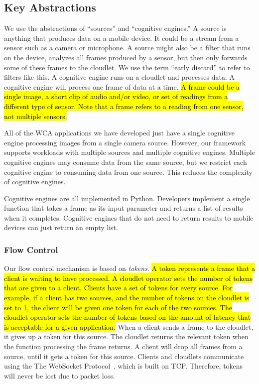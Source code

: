\subsection{Key Abstractions}

We use the abstractions of ``sources'' and ``cognitive engines.'' A source is
anything that produces data on a mobile device. It could be a stream from a
sensor such as a camera or microphone. A source might also be a filter that runs
on the device, analyzes all frames produced by a sensor, but then only forwards
some of these frames to the
cloudlet. We use the term ``early discard'' to refer to filters like
this. A cognitive engine runs on a cloudlet and processes data. A cognitive
engine will process one frame of data at a time.
\hl{
  A frame could be a single image, a short clip of audio and/or video, or set of
  readings from a different type of sensor.
  Note that a frame refers to a reading from one sensor, not multiple sensors.
}

All of the WCA applications we have developed just
have a single cognitive engine processing images from a single camera source.
However, our framework supports workloads with multiple sources and multiple
cognitive engines. Multiple cognitive engines may consume data from the same
source, but we restrict each cognitive engine to consuming data from one source.
This reduces the complexity of cognitive engines.

Cognitive engines are all implemented in Python. Developers implement a single
function that takes a frame as its input parameter and returns a list of
results when it completes. Cognitive engines that do not need to return results
to mobile devices can just return an empty list.

\subsubsection{Flow Control}

Our flow control mechanism is based on \emph{tokens}.
\hl{
  A token represents a frame that a client is waiting to have processed.
  A cloudlet operator sets the number of tokens that are given to a client.
  Clients have a set of tokens for every source.
  For example, if a client has two sources, and the number of tokens on the
  cloudlet is set to 1, the client will be given one token for each of the two
  sources.
  The cloudlet operator sets the number of tokens based on the amount of latency
  that is acceptable for a given application.
}
When a client
sends a frame to the cloudlet, it gives up a token for this source. The cloudlet
returns the relevant token when the function processing the frame returns.
A client will drop all frames from a source, until it gets a token for this
source. Clients and
cloudlets communicate using the The WebSocket Protocol~\cite{websocket}, which
is built on TCP.
Therefore, tokens will never be lost due to packet loss.

